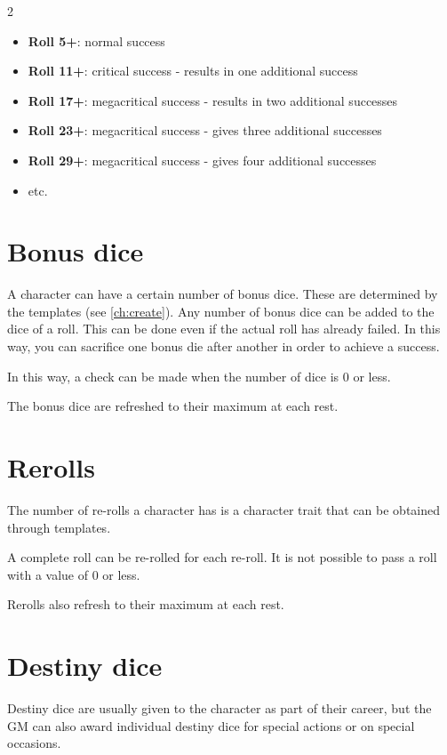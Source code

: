 \begin{multicols}{2}
\begin{itemize}
    \item \textbf{Roll 5+}: normal success
    \item \textbf{Roll 11+}: critical success - results in one additional success
    \item \textbf{Roll 17+}: megacritical success - results in two additional successes
    \item \textbf{Roll 23+}: megacritical success - gives three additional successes
    \item \textbf{Roll 29+}: megacritical success - gives four additional successes
    \item etc.
\end{itemize}

\section{Bonus dice}

A character can have a certain number of bonus dice. These are determined by the templates (see \cref{ch:create}). Any number of bonus dice can be added to the dice of a roll. This can be done even if the actual roll has already failed. In this way, you can sacrifice one bonus die after another in order to achieve a success.

In this way, a check can be made when the number of dice is 0 or less.

The bonus dice are refreshed to their maximum at each rest.

\section{Rerolls}

The number of re-rolls a character has is a character trait that can be obtained through templates.

A complete roll can be re-rolled for each re-roll. It is not possible to pass a roll with a value of 0 or less.

Rerolls also refresh to their maximum at each rest.

\section{Destiny dice}

Destiny dice are usually given to the character as part of their career, but the GM can also award individual destiny dice for special actions or on special occasions.


\end{multicols}
